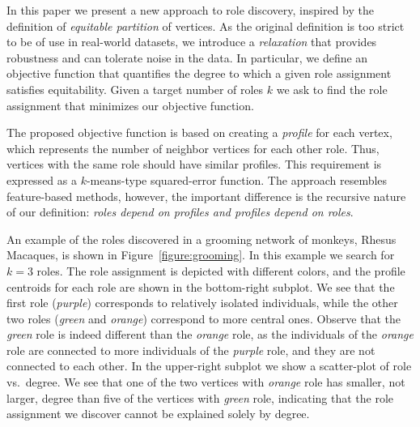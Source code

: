 \iffalse
An attractive definition for 
discovering roles in networks is based on the concept of
\emph{regular equivalence}~\cite{everett1994regular,white1983graph}:
According to regular equivalence, 
two vertices should be assigned to the same role
only if their neighbors have the same roles, ignoring multiplicities.
For example, 
for the collaboration network of a company
we may discover 
that vertices with role $A$ (``project manager'')
are connected to vertices with role 
$B$ (``business analyst'') and $C$ (``s/w developer''), 
while vertices with roles $B$ and $C$ are typically not connected to each other. 
\fi

In this paper we present a new approach to role discovery, 
inspired by the definition of \emph{equitable partition} of vertices.
As the original definition is too strict to be of use in real-world datasets, 
we introduce a \emph{relaxation} that provides robustness and can tolerate noise in the data.
In particular, we define an objective function that quantifies
the degree to which a given role assignment 
satisfies equitability.
Given a target number of roles $k$
we ask to find the role assignment that minimizes our objective function.



The proposed objective function is based on creating a \emph{profile} for each vertex, 
which represents the number of neighbor vertices for each other role.
Thus, vertices with the same role should have similar profiles.
This requirement is expressed as a $k$-means-type squared-error function. 
The approach resembles feature-based methods,
however, the important difference is the recursive nature of our definition: 
\emph{roles depend on profiles and profiles depend on roles}. 

An example of the roles discovered in a grooming network
of monkeys, Rhesus Macaques, 
is shown in Figure~\ref{figure:grooming}. 
In this example we search for $k=3$ roles. 
The role assignment is depicted with different colors, 
and the profile centroids for each role are shown in the bottom-right subplot.
We see that the first role ({\em purple}) corresponds to relatively isolated individuals, 
while the other two roles ({\em green} and {\em orange}) correspond to more central ones. 
Observe that the {\em green} role is indeed different than the {\em orange} role,
as the individuals of the {\em orange} role are connected to more individuals of the {\em purple} role, 
and they are not connected to each other. 
In the upper-right subplot we show a scatter-plot of role vs.\ degree. 
We see that one of the two vertices with {\em orange} role
has smaller, not larger, degree than five of the vertices with {\em green} role, 
indicating that the role assignment we discover cannot be explained solely by degree. 

